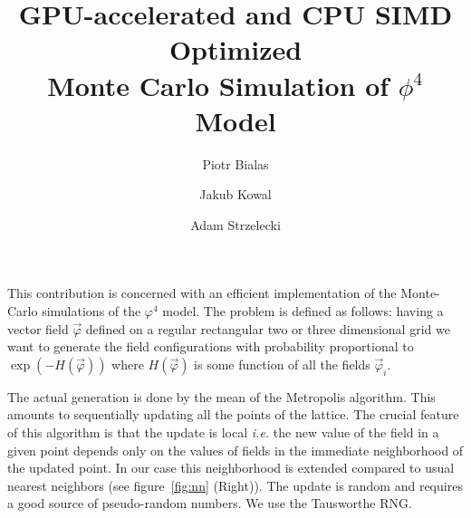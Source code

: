 \documentclass[a4paper]{llncs}
\title{ GPU-accelerated and CPU SIMD Optimized \\ Monte Carlo Simulation of $\phi^4$ Model}
\author{Piotr Bialas \and Jakub Kowal \and Adam Strzelecki}
\institute{Faculty of Physics, Astronomy and Applied Computer Science\\
Jagiellonian University\\
ul. Reymonta 4, 30-059 Krakow, Poland }
\newcommand{\vphi}{\vec{\varphi}}
\begin{document}
\maketitle


This contribution is concerned with an efficient implementation of the
Monte-Carlo simulations of the $\varphi^4$ model\cite{parisi}. The
problem is defined as follows: having a vector field $\vphi$ defined
on a regular rectangular two or three dimensional grid we want to
generate the field configurations with probability proportional to
$\exp(-H(\vphi))$ where $H(\vphi)$ is some function of all the fields
$\vphi_i$.

The actual generation is done by the mean of the Metropolis
algorithm. This amounts to sequentially updating all the points of the
lattice. The crucial feature of this algorithm is that the update is
local {\em i.e.} the new value of the field in a given point depends
only on the values of fields in the immediate neighborhood of the
updated point. In our case this neighborhood is extended compared to
usual nearest neighbors (see figure~\ref{fig:nn} (Right)). The update
is random and requires a good source of pseudo-random numbers. We use
the Tausworthe RNG\cite{howes_thomas07}.
\end{document}
